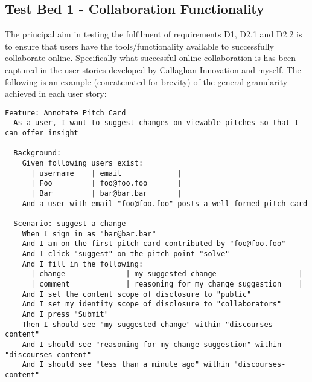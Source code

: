 \subsection{Test Bed 1 - Collaboration Functionality}\label{SS:collaborativeFunctionality}
The principal aim in testing the fulfilment of requirements D1, D2.1 and D2.2 is to ensure that users have the tools/functionality available to successfully collaborate online. Specifically what successful online collaboration is has been captured in the user stories developed by Callaghan Innovation and myself. The following is an example (concatenated for brevity) of the general granularity achieved in each user story:

\begin{lstlisting}[language=ustory,firstnumber=1]
Feature: Annotate Pitch Card
  As a user, I want to suggest changes on viewable pitches so that I can offer insight

  Background:
    Given following users exist:
      | username    | email             |
      | Foo         | foo@foo.foo       |
      | Bar         | bar@bar.bar       |
    And a user with email "foo@foo.foo" posts a well formed pitch card

  Scenario: suggest a change
    When I sign in as "bar@bar.bar"
    And I am on the first pitch card contributed by "foo@foo.foo"
    And I click "suggest" on the pitch point "solve"
    And I fill in the following:
      | change              | my suggested change                   |
      | comment             | reasoning for my change suggestion    |
    And I set the content scope of disclosure to "public"
    And I set my identity scope of disclosure to "collaborators"
    And I press "Submit"
    Then I should see "my suggested change" within "discourses-content"
    And I should see "reasoning for my change suggestion" within "discourses-content"
    And I should see "less than a minute ago" within "discourses-content"

\end{lstlisting}

